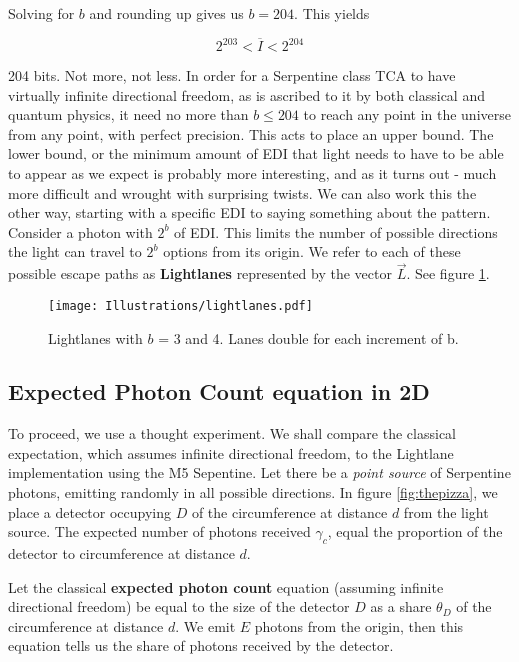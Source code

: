 \documentclass[notitlepage]{article}
\begin{document}
Solving for $b$ and rounding up gives us $b = 204$. This yields

\begin{equation}
 2^{203} < \overline{I} < 2^{204}
\end{equation} 

204 bits. Not more, not less. In order for a Serpentine class TCA to have virtually infinite directional freedom, as is ascribed to it by both  classical and quantum physics, it need no more than $b \leq 204$ to reach any point in the universe from any point, with perfect precision. This acts to place an upper bound. The lower bound, or the minimum amount of EDI that light needs to have to be able to appear as we expect is probably more interesting, and as it turns out - much more difficult and wrought with surprising twists.
We can also work this the other way, starting with a specific EDI to saying something about the pattern. Consider a photon with $2^b$ of EDI. This limits the number of possible directions the light can travel to $2^b$ options from its origin. We refer to each of these possible escape paths as \textbf{Lightlanes} represented by the vector $\vec{L}$. See figure \ref{fig:thejuul}.

\begin{figure}[!ht]
  \centering

 \texttt{[image: Illustrations/lightlanes.pdf]}
  \caption{Lightlanes with $b$ = 3 and 4. Lanes double for each increment of b. }
      \label{fig:thejuul}
\end{figure}


\subsection{Expected Photon Count equation in 2D}
To proceed, we use a thought experiment. We shall compare the classical expectation, which assumes infinite directional freedom, to the Lightlane implementation using the M5 Sepentine. Let there be a \textit{point source} of Serpentine photons, emitting randomly in all possible directions. In figure \ref{fig:thepizza}, we place a detector occupying $D$ of the circumference at distance $d$ from the light source. The expected number of photons received $\gamma_c $, equal the proportion of the detector to circumference at distance $d$. 

Let the classical \textbf{expected photon count} equation (assuming infinite directional freedom) be equal to the size of the detector $D$ as a share $\theta_D$ of the circumference at distance $d$. We emit $E $ photons from the origin, then this equation tells us the share of photons received by the detector.
\end{document}
